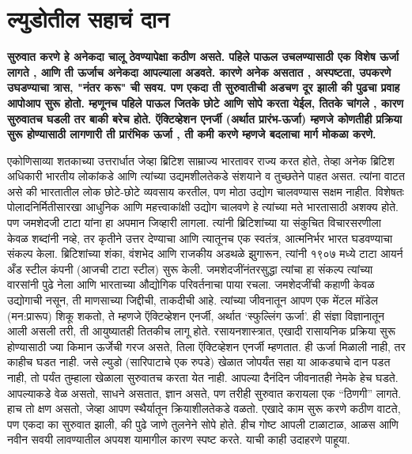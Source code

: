 \chapter{ल्युडोतील सहाचं दान}

\textcolor{blue!60!black}{\textbf{सुरुवात करणे हे अनेकदा चालू ठेवण्यापेक्षा कठीण असते. पहिले पाऊल उचलण्यासाठी एक विशेष ऊर्जा लागते , आणि ती ऊर्जाच अनेकदा आपल्याला अडवते. कारणे अनेक असतात , अस्पष्टता, उपकरणे उघडण्याचा त्रास, "नंतर करू" ची सवय. पण एकदा ती सुरुवातीची अडचण दूर झाली की पुढचा प्रवाह आपोआप सुरू होतो. म्हणूनच पहिले पाऊल जितके छोटे आणि सोपे करता येईल, तितके चांगले , कारण सुरुवातच घडली तर बाकी बरेच होते. ऍक्टिव्हेशन एनर्जी (अर्थात प्रारंभ-ऊर्जा) म्हणजे कोणतीही प्रक्रिया सुरू होण्यासाठी लागणारी ती प्रारंभिक ऊर्जा , ती कमी करणे म्हणजे बदलाचा मार्ग मोकळा करणे.}}

एकोणिसाव्या शतकाच्या उत्तरार्धात जेव्हा ब्रिटिश साम्राज्य भारतावर राज्य करत होते, तेव्हा अनेक ब्रिटिश अधिकारी भारतीय लोकांकडे आणि त्यांच्या उद्यमशीलतेकडे संशयाने व तुच्छतेने पाहत असत. त्यांना वाटत असे की भारतातील लोक छोटे-छोटे व्यवसाय करतील, पण मोठा उद्योग चालवण्यास सक्षम नाहीत. विशेषतः पोलादनिर्मितीसारखा आधुनिक आणि महत्त्वाकांक्षी उद्योग चालवणे हे त्यांच्या मते भारतासाठी अशक्य होते. पण जमशेदजी टाटा यांना हा अपमान जिव्हारी लागला. त्यांनी ब्रिटिशांच्या या संकुचित विचारसरणीला केवळ शब्दांनी नव्हे, तर कृतीने उत्तर देण्याचा आणि त्यातूनच एक स्वतंत्र, आत्मनिर्भर भारत घडवण्याचा संकल्प केला. ब्रिटिशांच्या शंका, वंशभेद आणि राजकीय अडथळे झुगारून, त्यांनी १९०७ मध्ये टाटा आयर्न अँड स्टील कंपनी (आजची टाटा स्टील) सुरू केली. जमशेदजींनंतरसुद्धा त्यांचा हा संकल्प त्यांच्या वारसांनी पुढे नेला आणि भारताच्या औद्योगिक परिवर्तनाचा पाया रचला. जमशेदजींची  कहाणी केवळ उद्योगाची नसून, ती माणसाच्या जिद्दीची, ताकदीची आहे. त्यांच्या जीवनातून आपण एक मेंटल मॉडेल (मन:प्रारूप) शिकू शकतो, ते म्हणजे ऍक्टिव्हेशन एनर्जी, अर्थात ‘स्फुल्लिंग ऊर्जा’. ही संज्ञा विज्ञानातून आली असली तरी, ती आयुष्यातही तितकीच लागू होते.
रसायनशास्त्रात, एखादी रासायनिक प्रक्रिया सुरू होण्यासाठी ज्या किमान ऊर्जेची गरज असते, तिला ऍक्टिव्हेशन एनर्जी म्हणतात. ही ऊर्जा मिळाली नाही, तर काहीच घडत नाही. जसे ल्युडो (सारिपाटाचे एक रुपडे) खेळात जोपर्यंत सहा या आकड्याचे दान पडत नाही, तो पर्यंत तुम्हाला खेळाला सुरुवातच करता येत नाही. आपल्या दैनंदिन जीवनातही नेमके हेच घडते. आपल्याकडे वेळ असतो, साधने असतात, ज्ञान असते, पण तरीही सुरुवात करायला एक “ठिणगी” लागते. हाच तो क्षण असतो, जेव्हा आपण स्थैर्यातून क्रियाशीलतेकडे वळतो. एखादे काम सुरू करणे कठीण वाटते, पण एकदा का सुरुवात झाली, की पुढे जाणे तुलनेने सोपे होते. हीच गोष्ट आपली टाळाटाळ, आळस आणि नवीन सवयी लावण्यातील अपयश यामागील कारण स्पष्ट करते. याची काही उदाहरणे पाहूया.
